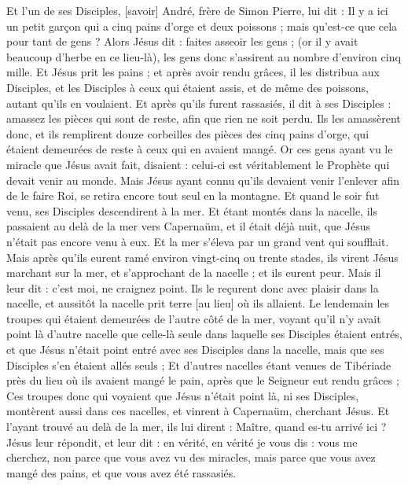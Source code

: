 \begin{multicols}{2}
Et l'un de ses Disciples, [savoir] André, frère de Simon Pierre, lui dit :
Il y a ici un petit garçon qui a cinq pains d'orge et deux poissons ; mais qu'est-ce que cela pour tant de gens ?
Alors Jésus dit : faites asseoir les gens ; (or il y avait beaucoup d'herbe en ce lieu-là), les gens donc s'assirent au nombre d'environ cinq mille.
Et Jésus prit les pains ; et après avoir rendu grâces, il les distribua aux Disciples, et les Disciples à ceux qui étaient assis, et de même des poissons, autant qu'ils en voulaient.
Et après qu'ils furent rassasiés, il dit à ses Disciples : amassez les pièces qui sont de reste, afin que rien ne soit perdu.
Ils les amassèrent donc, et ils remplirent douze corbeilles des pièces des cinq pains d'orge, qui étaient demeurées de reste à ceux qui en avaient mangé.
Or ces gens ayant vu le miracle que Jésus avait fait, disaient : celui-ci est véritablement le Prophète qui devait venir au monde.
Mais Jésus ayant connu qu'ils devaient venir l'enlever afin de le faire Roi, se retira encore tout seul en la montagne.
Et quand le soir fut venu, ses Disciples descendirent à la mer.
Et étant montés dans la nacelle, ils passaient au delà de la mer vers Capernaüm, et il était déjà nuit, que Jésus n'était pas encore venu à eux.
Et la mer s'éleva par un grand vent qui soufflait.
Mais après qu'ils eurent ramé environ vingt-cinq ou trente stades, ils virent Jésus marchant sur la mer, et s'approchant de la nacelle ; et ils eurent peur.
Mais il leur dit : c'est moi, ne craignez point.
Ils le reçurent donc avec plaisir dans la nacelle, et aussitôt la nacelle prit terre [au lieu] où ils allaient.
Le lendemain les troupes qui étaient demeurées de l'autre côté de la mer, voyant qu'il n'y avait point là d'autre nacelle que celle-là seule dans laquelle ses Disciples étaient entrés, et que Jésus n'était point entré avec ses Disciples dans la nacelle, mais que ses Disciples s'en étaient allés seuls ;
Et d'autres nacelles étant venues de Tibériade près du lieu où ils avaient mangé le pain, après que le Seigneur eut rendu grâces ;
Ces troupes donc qui voyaient que Jésus n'était point là, ni ses Disciples, montèrent aussi dans ces nacelles, et vinrent à Capernaüm, cherchant Jésus.
Et l'ayant trouvé au delà de la mer, ils lui dirent : Maître, quand es-tu arrivé ici ?
Jésus leur répondit, et leur dit : en vérité, en vérité je vous dis : vous me cherchez, non parce que vous avez vu des miracles, mais parce que vous avez mangé des pains, et que vous avez été rassasiés.

\end{multicols}
